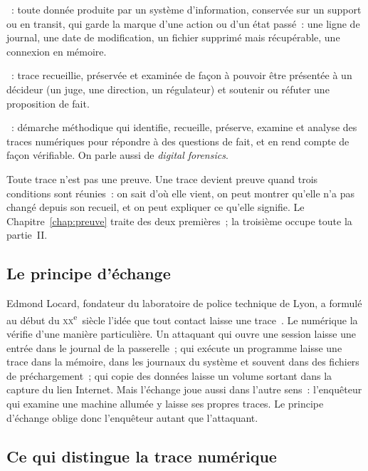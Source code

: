 \begin{boxdef}
\textbf{}~: toute donnée produite par un système
d'information, conservée sur un support ou en transit, qui garde la marque
d'une action ou d'un état passé~: une ligne de journal, une date de
modification, un fichier supprimé mais récupérable, une connexion en mémoire.

\smallskip
\textbf{}~: trace recueillie, préservée et
examinée de façon à pouvoir être présentée à un décideur (un juge, une
direction, un régulateur) et soutenir ou réfuter une proposition de fait.

\smallskip
\textbf{}~: démarche méthodique qui
identifie, recueille, préserve, examine et analyse des traces numériques
pour répondre à des questions de fait, et en rend compte de façon
vérifiable. On parle aussi de \textit{digital forensics}.
\end{boxdef}

Toute trace n'est pas une preuve. Une trace devient preuve quand trois
conditions sont réunies~: on sait d'où elle vient, on peut montrer qu'elle
n'a pas changé depuis son recueil, et on peut expliquer ce qu'elle signifie.
Le Chapitre~\ref{chap:preuve} traite des deux premières~; la troisième
occupe toute la partie~II.

\subsection{Le principe d'échange}

Edmond Locard, fondateur du laboratoire de police technique de Lyon, a
formulé au début du \textsc{xx}\textsuperscript{e}~siècle l'idée que tout
contact laisse une trace~\cite{locard1920}. Le numérique la vérifie d'une
manière particulière. Un attaquant qui ouvre une session laisse une entrée
dans le journal de la passerelle~; qui exécute un programme laisse une trace
dans la mémoire, dans les journaux du système et souvent dans des fichiers
de préchargement~; qui copie des données laisse un volume sortant dans la
capture du lien Internet. Mais l'échange joue aussi dans l'autre sens~:
l'enquêteur qui examine une machine allumée y laisse ses propres traces. Le
principe d'échange oblige donc l'enquêteur autant que l'attaquant.

\subsection{Ce qui distingue la trace numérique}

